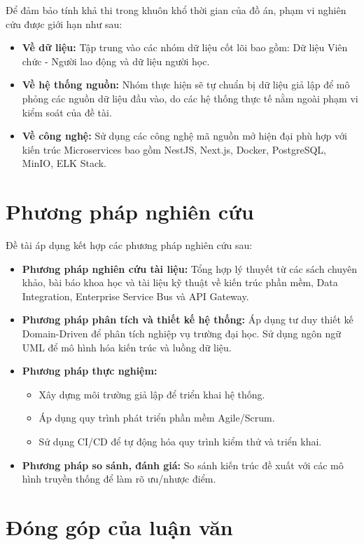 Để đảm bảo tính khả thi trong khuôn khổ thời gian của đồ án, phạm vi nghiên cứu được giới hạn như sau:

\begin{itemize}
    \item \textbf{Về dữ liệu:} Tập trung vào các nhóm dữ liệu cốt lõi bao gồm: Dữ liệu Viên chức - Người lao động và dữ liệu người học.
    \item \textbf{Về hệ thống nguồn:} Nhóm thực hiện sẽ tự chuẩn bị dữ liệu giả lập để mô phỏng các nguồn dữ liệu đầu vào, do các hệ thống thực tế nằm ngoài phạm vi kiểm soát của đề tài.
    \item \textbf{Về công nghệ:} Sử dụng các công nghệ mã nguồn mở hiện đại phù hợp với kiến trúc Microservices bao gồm NestJS, Next.js, Docker, PostgreSQL, MinIO, ELK Stack.
\end{itemize}

\section{Phương pháp nghiên cứu}

Đề tài áp dụng kết hợp các phương pháp nghiên cứu sau:

\begin{itemize}
    \item \textbf{Phương pháp nghiên cứu tài liệu:} Tổng hợp lý thuyết từ các sách chuyên khảo, bài báo khoa học và tài liệu kỹ thuật về kiến trúc phần mềm, Data Integration, Enterprise Service Bus và API Gateway.
    \item \textbf{Phương pháp phân tích và thiết kế hệ thống:} Áp dụng tư duy thiết kế Domain-Driven để phân tích nghiệp vụ trường đại học. Sử dụng ngôn ngữ UML để mô hình hóa kiến trúc và luồng dữ liệu.
    \item \textbf{Phương pháp thực nghiệm:}
    \begin{itemize}
        \item Xây dựng môi trường giả lập để triển khai hệ thống.
        \item Áp dụng quy trình phát triển phần mềm Agile/Scrum.
        \item Sử dụng CI/CD để tự động hóa quy trình kiểm thử và triển khai.
    \end{itemize}
    \item \textbf{Phương pháp so sánh, đánh giá:} So sánh kiến trúc đề xuất với các mô hình truyền thống để làm rõ ưu/nhược điểm.
\end{itemize}

\section{Đóng góp của luận văn}

